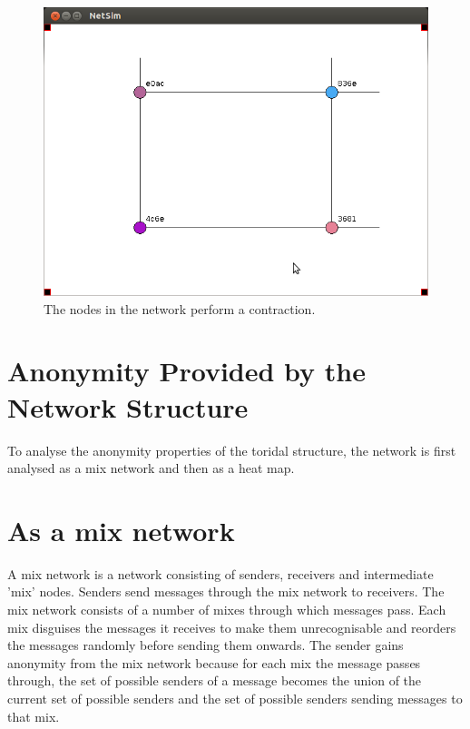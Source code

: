 \documentclass[ %
                    author={Luke Murray},
                supervisor={Dr. Simon Hollis},
                     title={Shadow Peer-to-Peer Networks},
                  subtitle={},
                    degree={MEng},
                      year={2013} ]{thesis}
\begin{document}
\begin{figure}[h]
    \centering
    \begin{minipage}[b]{0.45\linewidth}
        \centering
        \includegraphics[width=\linewidth]{sim_pics/balance_10.png}
        \caption{The nodes in the network perform a contraction.}
        \label{sim_balance7}
    \end{minipage}
\end{figure}

\section{Anonymity Provided by the Network Structure}

To analyse the anonymity properties of the toridal structure, the network is first analysed as a mix network and then as a heat map.

\section{As a mix network}

A mix network is a network consisting of senders, receivers and intermediate 'mix' nodes. Senders send messages through the mix network to receivers. The mix network consists of a number of mixes through which messages pass. Each mix disguises the messages it receives to make them unrecognisable and reorders the messages randomly before sending them onwards. The sender gains anonymity from the mix network because for each mix the message passes through, the set of possible senders of a message becomes the union of the current set of possible senders and the set of possible senders sending messages to that mix.
\end{document}
